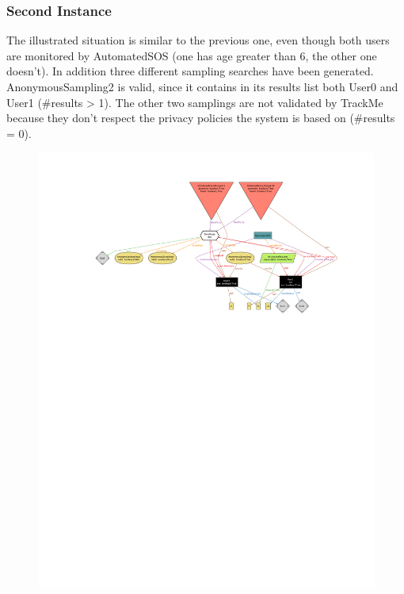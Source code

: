 \documentclass[12pt,a4paper]{article}
\begin{document}
		\subsubsection{Second Instance}
			The illustrated situation is similar to the previous one, even though both users are monitored by AutomatedSOS (one has age greater than 6, the other one doesn't). 
			In addition three different sampling searches have been generated. AnonymousSampling2 is valid, since it contains in its results list both User0 and User1 (#results > 1). The other two samplings are not validated by TrackMe because they don't respect the privacy policies the system is based on (#results = 0).
			\begin{figure}[H]
				\centering
				\includegraphics[width=1.25\linewidth]{Images/second-world}
				\label{fig:second-world}
			\end{figure}

	\newpage
\end{document}
